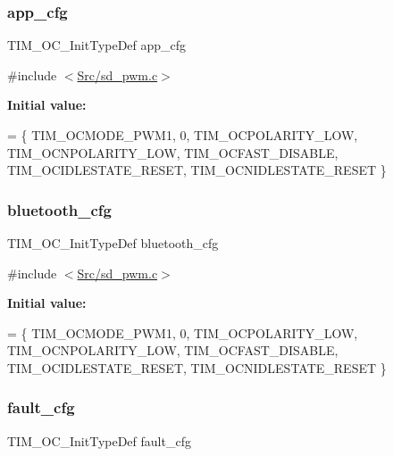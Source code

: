 \subsubsection{\texorpdfstring{app\+\_\+cfg}{app\_cfg}}
{\footnotesize\ttfamily T\+I\+M\+\_\+\+O\+C\+\_\+\+Init\+Type\+Def app\+\_\+cfg\hspace{0.3cm}{\ttfamily [static]}}



{\ttfamily \#include $<$\mbox{\hyperlink{sd__pwm_8c}{Src/sd\+\_\+pwm.\+c}}$>$}

{\bfseries Initial value\+:}
\begin{DoxyCode}
= \{
    TIM\_OCMODE\_PWM1,
    0,
    TIM\_OCPOLARITY\_LOW,
    TIM\_OCNPOLARITY\_LOW,
    TIM\_OCFAST\_DISABLE,
    TIM\_OCIDLESTATE\_RESET,
    TIM\_OCNIDLESTATE\_RESET
\}
\end{DoxyCode}
\mbox{\label{group___s_d___p_w_m_gae3fa77e9e0878a275a8cd304bc4926c3}} 
\subsubsection{\texorpdfstring{bluetooth\+\_\+cfg}{bluetooth\_cfg}}
{\footnotesize\ttfamily T\+I\+M\+\_\+\+O\+C\+\_\+\+Init\+Type\+Def bluetooth\+\_\+cfg\hspace{0.3cm}{\ttfamily [static]}}



{\ttfamily \#include $<$\mbox{\hyperlink{sd__pwm_8c}{Src/sd\+\_\+pwm.\+c}}$>$}

{\bfseries Initial value\+:}
\begin{DoxyCode}
= \{
    TIM\_OCMODE\_PWM1,
    0,
    TIM\_OCPOLARITY\_LOW,
    TIM\_OCNPOLARITY\_LOW,
    TIM\_OCFAST\_DISABLE,
    TIM\_OCIDLESTATE\_RESET,
    TIM\_OCNIDLESTATE\_RESET
\}
\end{DoxyCode}
\mbox{\label{group___s_d___p_w_m_ga5bc9c8a172b4c75930387af65adf2e26}} 
\subsubsection{\texorpdfstring{fault\+\_\+cfg}{fault\_cfg}}
{\footnotesize\ttfamily T\+I\+M\+\_\+\+O\+C\+\_\+\+Init\+Type\+Def fault\+\_\+cfg\hspace{0.3cm}{\ttfamily [static]}}



